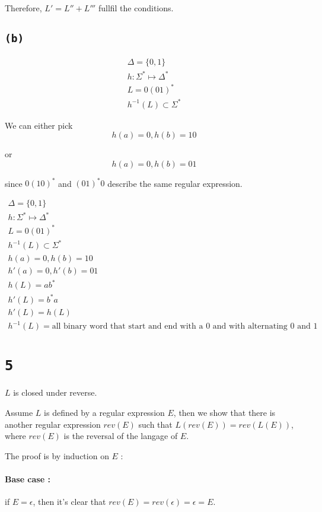 \documentclass[a4paper,11pt]{report}
\begin{document}
\paragraph{} Therefore, $L' = L'' + L'''$ fullfil the conditions.

\subsection*{\texttt{(b)}}

\begin{gather*}
  \Delta = \{0,1\} \\
  h : \Sigma^* \mapsto \Delta^* \\
  L = 0(01)^* \\
  h^{-1}(L) \subset \Sigma^*
\end{gather*}

We can either pick
\[
  h(a) = 0, h(b) = 10
\]

or
\[
  h(a) = 0, h(b) = 01
\]

since $0(10)^*$ and $(01)^*0$ describe the same regular expression.


\begin{gather*}
  \Delta = \{0,1\} \\
  h : \Sigma^* \mapsto \Delta^* \\
  L = 0(01)^* \\
  h^{-1}(L) \subset \Sigma^* \\
  h(a) = 0, h(b) = 10 \\
  h'(a) = 0, h'(b) = 01 \\
  h(L) = ab^* \\
  h'(L) = b^*a \\
  h'(L) = h(L)\\
  h^{-1}(L) = \text{all binary word that start and end with a $0$ and with
    alternating $0$ and $1$}
\end{gather*}

\section*{\texttt{5}}

$L$ is closed under reverse.

Assume $L$ is defined by a regular expression $E$, then we show that there is
another regular expression $rev(E)$ such that $L(rev(E)) = rev(L(E))$, where
$rev(E)$ is the reversal of the langage of $E$.

The proof is by induction on $E$ :

\paragraph{Base case :} if $E = \epsilon$, then it's clear that $rev(E) =
rev(\epsilon) = \epsilon = E$.
\end{document}

